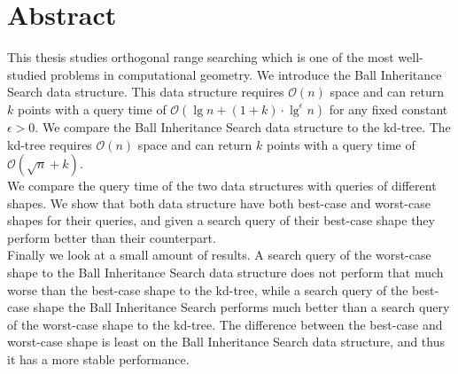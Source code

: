 \documentclass[twoside,11pt,openright]{report}
\begin{document}
\pagestyle{empty} 
\vspace*{\fill}
\clearpage


\pagestyle{plain}
\chapter*{Abstract}

This thesis studies orthogonal range searching which is one of the most well-studied problems in computational geometry. We introduce the Ball Inheritance Search data structure. This data structure requires $\mathcal{O}(n)$ space and can return $k$ points with a query time of $\mathcal{O}(\lg n + (1+k)\cdot\lg^\epsilon n)$ for any fixed constant $\epsilon > 0$. We compare the Ball Inheritance Search data structure to the kd-tree. The kd-tree requires $\mathcal{O}(n)$ space and can return $k$ points with a query time of $\mathcal{O}(\sqrt{n} + k)$.\\

We compare the query time of the two data structures with queries of different shapes. We show that both data structure have both best-case and worst-case shapes for their queries, and given a search query of their best-case shape they perform better than their counterpart.\\

Finally we look at a small amount of results. A search query of the worst-case shape to the Ball Inheritance Search data structure does not perform that much worse than the best-case shape to the kd-tree, while a search query of the best-case shape the Ball Inheritance Search performs much better than a search query of the worst-case shape to the kd-tree. The difference between the best-case and worst-case shape is least on the Ball Inheritance Search data structure, and thus it has a more stable performance.
\end{document}
